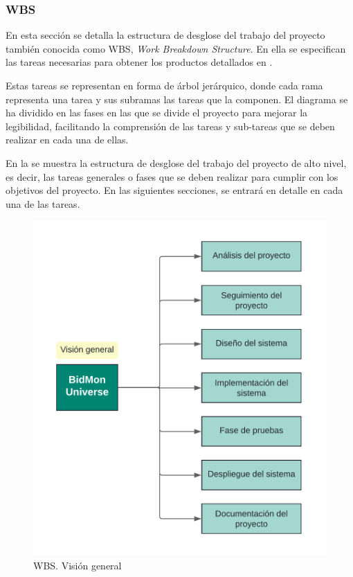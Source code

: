\subsubsection{WBS} \label{sec:5-WBS}
\hypertarget{sec:5-WBS}{}
En esta sección se detalla la estructura de desglose del trabajo del proyecto también conocida como WBS, \textit{Work Breakdown Structure}. 
En ella se especifican las tareas necesarias para obtener los productos detallados en .

Estas tareas se representan en forma de árbol jerárquico, donde cada rama representa una tarea y sus subramas las tareas que la componen.
El diagrama se ha dividido en las fases en las que se divide el proyecto para mejorar la legibilidad, facilitando la comprensión de las tareas y sub-tareas que se deben realizar en cada una de ellas.

En la  se muestra la estructura de desglose del trabajo del proyecto de alto nivel, es decir, 
las tareas generales o fases que se deben realizar para cumplir con los objetivos del proyecto.
En las siguientes secciones, se entrará en detalle en cada una de las tareas.
\begin{figure}[H]
    \hypertarget{fig:5_WBS-Vision-General}{}
    \centering
    \includegraphics[width=0.5\linewidth]{figures/5-WBS/5_WBS-Vision-General.png}
    \caption{WBS. Visión general}
    \label{fig:5_WBS-Vision-General}
\end{figure}

